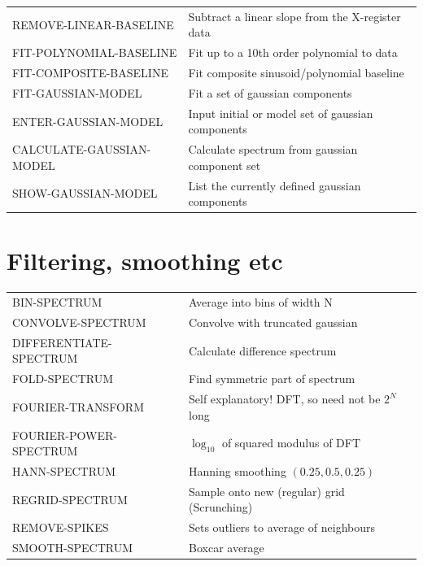 \documentclass[11pt,twoside]{report}
\begin{document}
\begin{tabular}{ll}
REMOVE-LINEAR-BASELINE   & Subtract a linear slope from the X-register data\\
FIT-POLYNOMIAL-BASELINE  & Fit up to a 10th order polynomial to data\\
FIT-COMPOSITE-BASELINE   & Fit composite sinusoid/polynomial baseline\\
FIT-GAUSSIAN-MODEL       & Fit a set of gaussian components\\
ENTER-GAUSSIAN-MODEL     & Input initial or model set of gaussian components\\
CALCULATE-GAUSSIAN-MODEL & Calculate spectrum from gaussian component set\\
SHOW-GAUSSIAN-MODEL      & List the currently defined gaussian components\\
\end{tabular}

\section{Filtering, smoothing etc}  

\begin{tabular}{ll}
BIN-SPECTRUM             & Average into bins of width N\\
CONVOLVE-SPECTRUM        & Convolve with truncated gaussian\\
DIFFERENTIATE-SPECTRUM   & Calculate difference spectrum\\
FOLD-SPECTRUM            & Find symmetric part of spectrum\\
FOURIER-TRANSFORM        & Self explanatory! DFT, so need not be $2^N$ long\\
FOURIER-POWER-SPECTRUM   & $\log_{10}$ of squared modulus of DFT\\
HANN-SPECTRUM            & Hanning smoothing $(0.25,0.5,0.25)$\\
REGRID-SPECTRUM          & Sample onto new (regular) grid (Scrunching)\\
REMOVE-SPIKES            & Sets outliers to average of neighbours\\
SMOOTH-SPECTRUM          & Boxcar average\\
\end{tabular}
\end{document}
